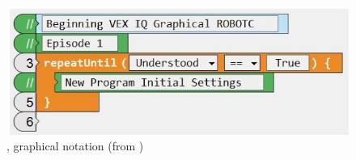 
\begin{figure}[t]
	\centering
		\includegraphics[width=\columnwidth]{robotc2.png}	\caption{\robotc, graphical notation (from \cite{Admin})%
		}
	\label{fig:robotcgraphical}
\end{figure}




